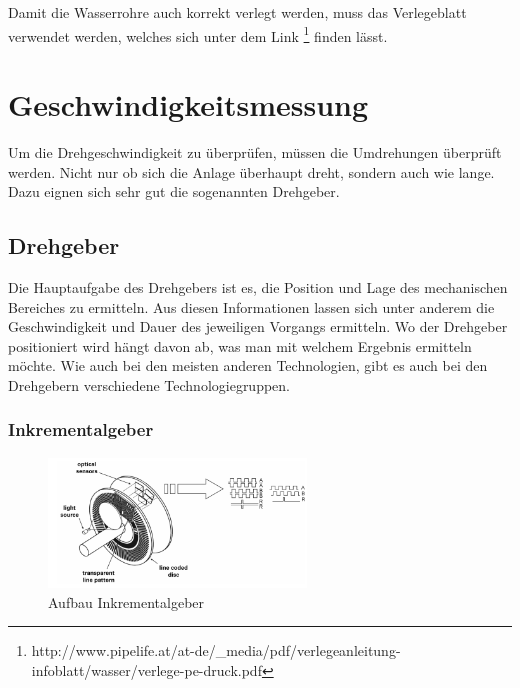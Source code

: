 Damit die Wasserrohre auch korrekt verlegt werden, muss das Verlegeblatt verwendet werden, welches sich unter dem Link \footnote{http://www.pipelife.at/at-de/_media/pdf/verlegeanleitung-infoblatt/wasser/verlege-pe-druck.pdf} finden lässt.

\newpage
\section{Geschwindigkeitsmessung}
\label{sec:geschwindigkeitsmessung}

Um die Drehgeschwindigkeit zu überprüfen, müssen die Umdrehungen überprüft werden. Nicht nur ob sich die Anlage überhaupt dreht, sondern auch wie lange. Dazu eignen sich sehr gut die sogenannten Drehgeber.

\subsection{Drehgeber}
\label{sec:drehgeber}

Die Hauptaufgabe des Drehgebers ist es, die Position und Lage des mechanischen Bereiches zu ermitteln. Aus diesen Informationen lassen sich unter anderem die Geschwindigkeit und Dauer des jeweiligen Vorgangs ermitteln. Wo der Drehgeber positioniert wird hängt davon ab, was man mit welchem Ergebnis ermitteln möchte. Wie auch bei den meisten anderen Technologien, gibt es auch bei den Drehgebern verschiedene Technologiegruppen.

\subsubsection{Inkrementalgeber}
\label{sec:inkrementalgeber}

\begin{figure}[!ht]
\begin{center}
	\caption{Aufbau Inkrementalgeber \label{fig:inkrementalgeber}}
	\includegraphics[width=0.61\textwidth]{Inkrementalgeber}
\end{center}
\end{figure}

